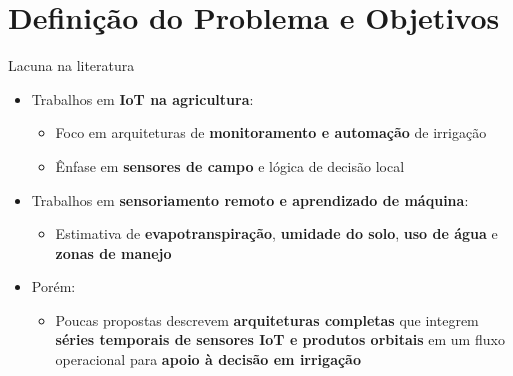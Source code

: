 \documentclass[aspectratio=169]{beamer}
\begin{document}
\section{Definição do Problema e Objetivos}

\begin{frame}{Lacuna na literatura}
  \begin{itemize}
    \item Trabalhos em \textbf{IoT na agricultura}:
      \begin{itemize}
        \item Foco em arquiteturas de \textbf{monitoramento e automação} de irrigação
        \item Ênfase em \textbf{sensores de campo} e lógica de decisão local
      \end{itemize}
    \item Trabalhos em \textbf{sensoriamento remoto e aprendizado de máquina}:
      \begin{itemize}
        \item Estimativa de \textbf{evapotranspiração}, \textbf{umidade do solo}, \textbf{uso de água} e \textbf{zonas de manejo}
      \end{itemize}
    \item Porém:
      \begin{itemize}
        \item Poucas propostas descrevem \textbf{arquiteturas completas} que integrem
              \textbf{séries temporais de sensores IoT e produtos orbitais} em um fluxo operacional
              para \textbf{apoio à decisão em irrigação}
      \end{itemize}
  \end{itemize}
\end{frame}
\end{document}
